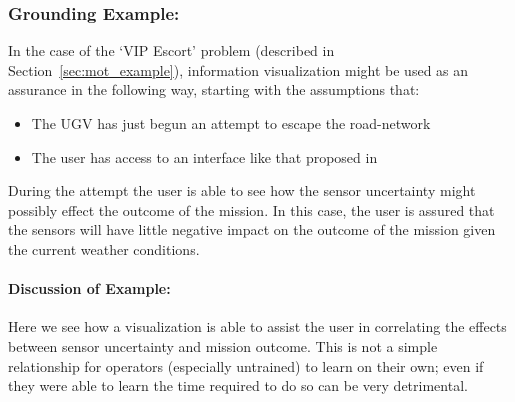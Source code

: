 \subsubsection{Grounding Example:}
In the case of the `VIP Escort' problem (described in Section~\ref{sec:mot_example}), information visualization might be used as an assurance in the following way, starting with the assumptions that:

\begin{itemize}
    \item The UGV has just begun an attempt to escape the road-network
    \item The user has access to an interface like that proposed in \cite{Hutchins2015-if}
\end{itemize}

During the attempt the user is able to see how the sensor uncertainty might possibly effect the outcome of the mission. In this case, the user is assured that the sensors will have little negative impact on the outcome of the mission given the current weather conditions.

\paragraph{\textbf{Discussion of Example:}} Here we see how a visualization is able to assist the user in correlating the effects between sensor uncertainty and mission outcome. This is not a simple relationship for operators (especially untrained) to learn on their own; even if they were able to learn the time required to do so can be very detrimental.
